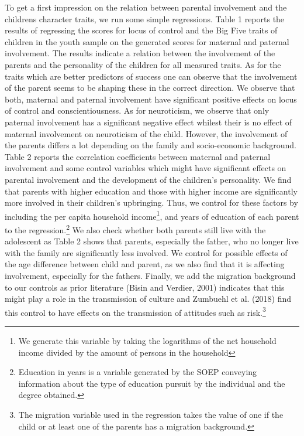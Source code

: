 \documentclass[%
    a4paper,            %
    11pt,               %
    bibliography=totoc, %
]
{scrartcl}
\begin{document}
To get a first impression on the relation between parental involvement and the childrens character traits, we run some simple regressions. 
Table 1 reports the results of regressing the scores for locus of control and the Big Five traits of children in the youth sample on the generated scores for maternal and paternal involvement. The results indicate a relation between the involvement of the parents and the personality of the children for all measured traits. As for the traits which are better predictors of success one can observe that the involvement of the parent seems to be shaping these in the correct direction. We observe that both, maternal and paternal involvement have significant positive effects on locus of control and conscientiousness. As for neuroticism, we observe that only paternal involvement has a significant negative effect whilest their is no effect of maternal involvement on neuroticism of the child. \newline 
However, the involvement of the parents differs a lot depending on the family and socio-economic background. Table 2 reports the correlation coefficients between maternal and paternal involvement and some control variables which might have significant effects on parental involvement and the development of the children's personality. We find that parents with higher education and those with higher income are significantly more involved in their children's upbringing. Thus, we control for these factors by including the per capita household income\footnote{We generate this variable by taking the logarithms of the net household income divided by the amount of persons in the household}, and years of education of each parent to the regression.\footnote{Education in years is a variable generated by the SOEP conveying information about the type of education pursuit by the individual and the degree obtained.} We also check whether both parents still live with the adolescent as Table 2 shows that parents, especially the father, who no longer live with the family are significantly less involved. We control for possible effects of the age difference between child and parent, as we also find that it is affecting involvement, especially for the fathers.  Finally, we add the migration background to our controls as prior literature (Bisin and Verdier, 2001) indicates that this might play a role in the transmission of culture and Zumbuehl et al. (2018) find this control to have effects on the transmission of attitudes such as risk.\footnote{The migration variable used in the regression takes the value of one if the child or at least one of the parents has a migration background.}
\end{document}
